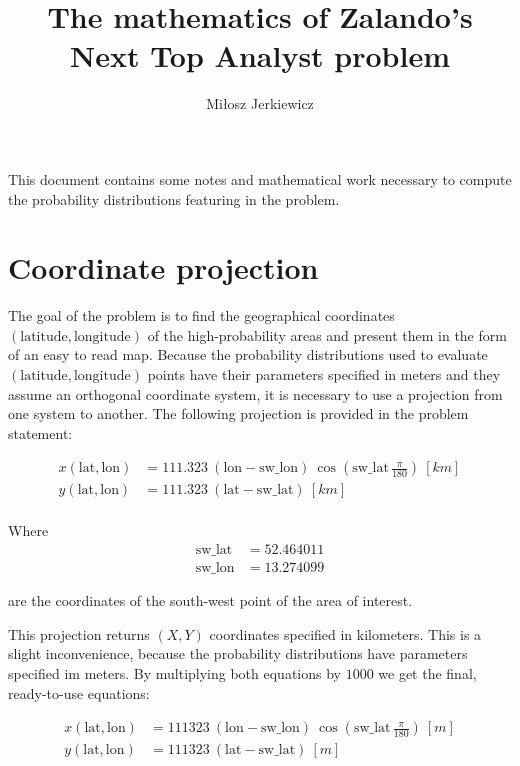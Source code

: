 \documentclass[a4paper,12pt]{article}
\title{\vspace{-2cm}The mathematics of Zalando's Next Top Analyst problem}
\date{}
\author{Miłosz Jerkiewicz}
\begin{document}
\maketitle
\thispagestyle{empty}

This document contains some notes and mathematical work necessary to compute the probability distributions featuring
in the problem.


\section{Coordinate projection}

The goal of the problem is to find the geographical coordinates \((\mbox{latitude}, \mbox{longitude})\) of the high-probability areas
and present them in the form of an easy to read map.
Because the probability distributions used to evaluate \((\mbox{latitude}, \mbox{longitude})\) points have their parameters
specified in meters and they assume an orthogonal coordinate system, it is necessary to use a projection from one system
to another. The following projection is provided in the problem statement:

\begin{align*}
  x(\mbox{lat}, \mbox{lon}) &= 111.323\:(\mbox{lon} - \mbox{sw\_lon})\:\cos(\mbox{sw\_lat}\,\frac{\pi}{180})\ [km]\\
  y(\mbox{lat}, \mbox{lon}) &= 111.323\:(\mbox{lat} - \mbox{sw\_lat})\ [km]\\
\end{align*}

Where
\begin{align*}
  \mbox{sw\_lat} &= 52.464011\\
  \mbox{sw\_lon} &= 13.274099
\end{align*}

are the coordinates of the south-west point of the area of interest.

This projection returns \((X, Y)\) coordinates specified in kilometers. This is a slight inconvenience, because the probability distributions
have parameters specified im meters. By multiplying both equations by \(1000\) we get the final, ready-to-use equations:

\begin{align*}
  x(\mbox{lat}, \mbox{lon}) &= 111323\:(\mbox{lon} - \mbox{sw\_lon})\:\cos(\mbox{sw\_lat}\,\frac{\pi}{180})\ [m]\\
  y(\mbox{lat}, \mbox{lon}) &= 111323\:(\mbox{lat} - \mbox{sw\_lat})\ [m]
\end{align*}
\end{document}
